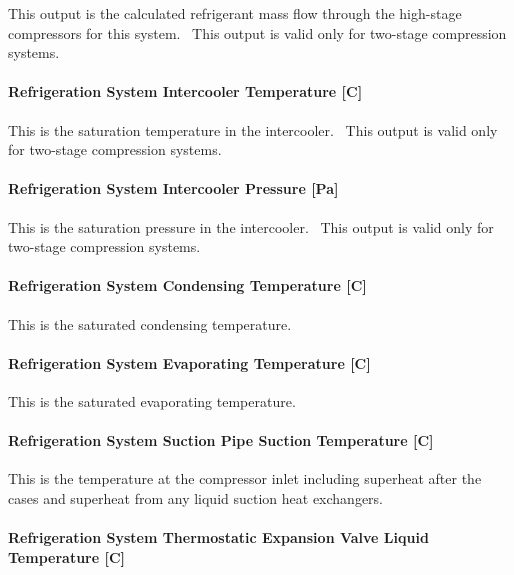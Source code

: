 This output is the calculated refrigerant mass flow through the high-stage compressors for this system.~ This output is valid only for two-stage compression systems.

\paragraph{Refrigeration System Intercooler Temperature {[}C{]}}\label{refrigeration-system-intercooler-temperature-c}

This is the saturation temperature in the intercooler.~ This output is valid only for two-stage compression systems.

\paragraph{Refrigeration System Intercooler Pressure {[}Pa{]}}\label{refrigeration-system-intercooler-pressure-pa}

This is the saturation pressure in the intercooler.~ This output is valid only for two-stage compression systems.

\paragraph{Refrigeration System Condensing Temperature {[}C{]}}\label{refrigeration-system-condensing-temperature-c}

This is the saturated condensing temperature.

\paragraph{Refrigeration System Evaporating Temperature {[}C{]}}\label{refrigeration-system-evaporating-temperature-c}

This is the saturated evaporating temperature.

\paragraph{Refrigeration System Suction Pipe Suction Temperature {[}C{]}}\label{refrigeration-system-suction-pipe-suction-temperature-c}

This is the temperature at the compressor inlet including superheat after the cases and superheat from any liquid suction heat exchangers.

\paragraph{Refrigeration System Thermostatic Expansion Valve Liquid Temperature {[}C{]}}\label{refrigeration-system-thermostatic-expansion-valve-liquid-temperature-c}

